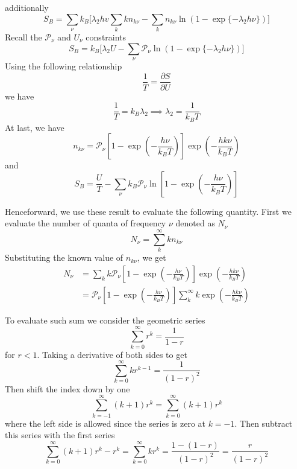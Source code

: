 \documentclass[../../../Main.tex]{subfiles}
\begin{document}
additionally
\begin{equation*}
    S_B= \sum_\nu k_B \bigg[\lambda_2hv\sum_{k}kn_{k\nu} - \sum_{k} n_{k\nu}\ln (1-\exp\{-\lambda_2h\nu\})\bigg]
\end{equation*}
Recall the $\mathcal{P}_\nu$ and $U_\nu$ constraints
\begin{equation*}
    S_B= k_B \bigg[\lambda_2U- \sum_\nu\mathcal{P}_\nu \ln (1-\exp\{-\lambda_2h\nu\})\bigg]
\end{equation*}
Using the following relationship
\begin{equation*}
    \frac{1}{T}=\frac{\partial S}{\partial U}
\end{equation*}
we have
\begin{equation*}
    \frac{1}{T}=k_B\lambda_2\implies \lambda_2=\frac{1}{k_BT}
\end{equation*}
At last, we have 
\begin{equation*}
    n_{k\nu}=\mathcal{P}_\nu\left[1-\exp\left(-\frac{h\nu}{k_BT}\right)\right]\exp\left(-\frac{hk\nu}{k_BT}\right)
\end{equation*}
and
\begin{equation*}
    S_B= \frac{U}{T}- \sum_\nu k_B\mathcal{P}_\nu \ln \left[1-\exp\left(-\frac{h\nu}{k_BT}\right)\right]
\end{equation*}

Henceforward, we use these result to evaluate the following quantity. First we evaluate the number of quanta of frequency $\nu$ denoted as $N_\nu$
\begin{equation*}
    N_\nu=\sum_k^{\infty} kn_{k\nu}
\end{equation*}
Substituting the known value of $n_{k\nu}$, we get 
\begin{align*}
    N_\nu&=\sum_k k \mathcal{P}_\nu\left[1-\exp\left(-\frac{h\nu}{k_BT}\right)\right]\exp\left(-\frac{hk\nu}{k_BT}\right)\\
    &=\mathcal{P}_\nu\left[1-\exp\left(-\frac{h\nu}{k_BT}\right)\right] \sum_k^{\infty} k \exp\left(-\frac{hk\nu}{k_BT}\right)
\end{align*}

To evaluate such sum we consider the geometric series
\begin{equation*}
    \sum_{k=0}^{\infty}r^{k}=\frac{1}{1-r}
\end{equation*}
for $r<1$. Taking a derivative of both sides to get
\begin{equation*}
    \sum_{k=0}^{\infty}kr^{k-1}=\frac{1}{(1-r)^2}
\end{equation*}
Then shift the index down by one 
\begin{equation*}
    \sum_{k=-1}^{\infty}(k+1)r^{k}=\sum_{k=0}^{\infty}(k+1)r^{k}
\end{equation*}
where the left side is allowed since the series is zero at $k=-1$. Then subtract this series with the first series
\begin{equation*}
    \sum_{k=0}^{\infty}(k+1)r^{k}-r^k=\sum_{k=0}^{\infty} kr^k=\frac{1-(1-r)}{(1-r)^2}=\frac{r}{(1-r)^2}
\end{equation*}
\end{document}
